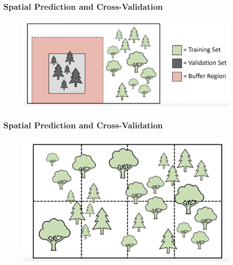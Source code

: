 \documentclass[
  shownotes,
  xcolor={svgnames},
  hyperref={colorlinks,citecolor=DarkBlue,linkcolor=andesred,urlcolor=DarkBlue}
  , aspectratio=169]{beamer}
\begin{document}
\begin{frame}[fragile]
\frametitle{Spatial Prediction and Cross-Validation}

  \begin{minipage}[c]{0.6\linewidth}
        
      \begin{figure}[H] \centering
        \captionsetup{justification=centering}
        \includegraphics[scale=0.3]{figures/spatial_cross/fig12.png}
      \end{figure}
           
    \end{minipage}
    \hfill
    \begin{minipage}[t]{0.35\linewidth}%
    

    \end{minipage}

\end{frame}
\begin{frame}[fragile]
\frametitle{Spatial Prediction and Cross-Validation}

  \begin{minipage}[c]{0.6\linewidth}
        
      \begin{figure}[H] \centering
        \captionsetup{justification=centering}
        \includegraphics[scale=0.3]{figures/spatial_cross/fig13.png}
      \end{figure}
           
    \end{minipage}
    \hfill
    \begin{minipage}[t]{0.35\linewidth}%
    

    \end{minipage}

\end{frame}
\end{document}

